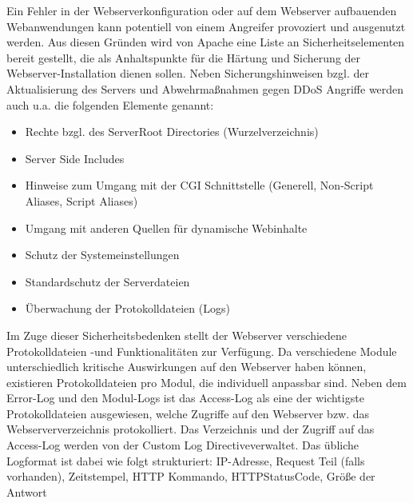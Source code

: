 Ein Fehler in der Webserverkonfiguration oder auf dem Webserver aufbauenden Webanwendungen kann potentiell von einem Angreifer provoziert und ausgenutzt werden. Aus diesen Gründen wird von Apache eine Liste an Sicherheitselementen bereit gestellt, die als Anhaltspunkte für die Härtung und Sicherung der Webserver-Installation dienen sollen. Neben Sicherungshinweisen bzgl. der Aktualisierung des Servers und Abwehrmaßnahmen gegen DDoS Angriffe werden auch u.a. die folgenden Elemente genannt:
\begin{itemize}
\item Rechte bzgl. des ServerRoot Directories (Wurzelverzeichnis)
\item Server Side Includes
\item Hinweise zum Umgang mit der CGI Schnittstelle (Generell, Non-Script Aliases, Script Aliases)
\item Umgang mit anderen Quellen für dynamische Webinhalte
\item Schutz der Systemeinstellungen
\item Standardschutz der Serverdateien 
\item Überwachung der Protokolldateien (Logs)
\end{itemize}

Im Zuge dieser Sicherheitsbedenken stellt der Webserver verschiedene Protokolldateien -und Funktionalitäten zur Verfügung. Da verschiedene Module unterschiedlich kritische Auswirkungen auf den Webserver haben können, existieren Protokolldateien pro Modul, die individuell anpassbar sind. 
Neben dem Error-Log und den Modul-Logs ist das Access-Log als eine der wichtigste Protokolldateien ausgewiesen, welche Zugriffe auf den Webserver bzw. das Webserververzeichnis protokolliert.
Das Verzeichnis und der Zugriff auf das Access-Log werden von der \glqq Custom Log Directive\grqq  verwaltet. Das übliche Logformat ist dabei wie folgt strukturiert:
\glqq IP-Adresse, Request Teil (falls vorhanden), Zeitstempel, HTTP Kommando, HTTPStatusCode, Größe der Antwort\grqq

